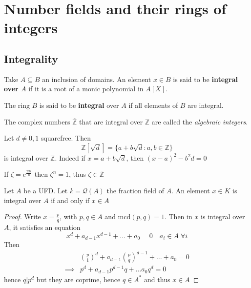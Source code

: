 \chapter{Number fields and their rings of integers}

\section{Integrality}

\begin{definition}{}
    Take \(A \subseteq B \) an inclusion of domains. An element \(x \in B\) is
    said to be \textbf{integral over \(A\)} if it is a root of a monic
    polynomial in \(A[X]\).

    The ring \(B\) is said to be \textbf{integral} over \(A\) if all elements of
    \(B\) are integral.
\end{definition}

\begin{example}{}
    The complex numbers \(\overline{\mathbb{Z}}\) that are integral over
    \(\mathbb{Z}\) are called the \emph{algebraic integers}.
\end{example}

\begin{example}{}
    Let \(d \neq 0, 1\) squarefree. Then
    \[
        \mathbb{Z}[\sqrt{d}] = \{a + b \sqrt{d} : a, b \in \mathbb{Z}\} 
    \]
    is integral over \(\mathbb{Z}\). Indeed if \(x = a + b \sqrt{d}\), then
    \({(x - a)}^2 - b^2 d = 0\) 
\end{example}

\begin{example}{}
    If \(\zeta = e^{\frac{2\pi i}{n}}\) then \(\zeta^{n} = 1\), thus \(\zeta \in
    \overline{\mathbb{Z}}\) 
\end{example}

\begin{proposition}{}
    Let \(A\) be a UFD. Let \(k = \mathcal{Q}{(A)}\) the fraction field of
    \(A\). An element \(x \in K\) is integral over \(A\) if and only if \(x \in
    A\) 
\end{proposition}
\begin{proof}{}
    Write \(x = \frac{p}{q}\), with \(p, q \in A\) and \(\mathrm{mcd}{(p, q)} =
    1\). Then in \(x\) is integral over \(A\), it satisfies an equation
    \[
      x^{d} + a_{d-1} x^{d-1} + \dots + a_{0} = 0 \quad a_{i} \in A \; \forall i
    \]
    Then
    \begin{align*}
       &{\left( \frac{p}{1} \right)} ^{d} + a_{d-1} {\left( \frac{p}{q}
       \right)}^{d-1} + \dots + a_{0} = 0\\
        \implies &p^{d} + a_{d-1} p^{d-1}q + \dots a_{0} q^{d} = 0
    \end{align*}
    hence \(q | p^{d}\) but they are coprime, hence \(q \in  A^{*}\) and thus
    \(x \in A\) 
\end{proof}

